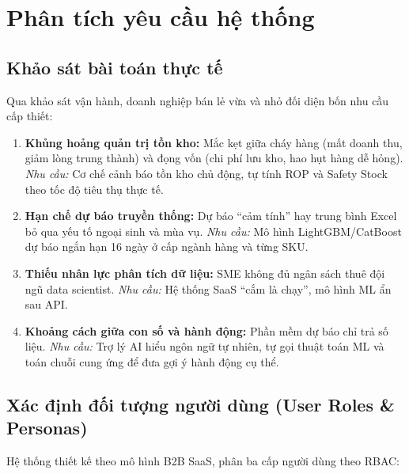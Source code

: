 \documentclass[12pt,a4paper]{report}
\begin{document}
\section{Phân tích yêu cầu hệ thống}

\subsection{Khảo sát bài toán thực tế}
Qua khảo sát vận hành, doanh nghiệp bán lẻ vừa và nhỏ đối diện bốn nhu cầu cấp thiết:

\begin{enumerate}
    \item \textbf{Khủng hoảng quản trị tồn kho:} Mắc kẹt giữa cháy hàng (mất doanh thu, giảm lòng trung thành) và đọng vốn (chi phí lưu kho, hao hụt hàng dễ hỏng). \textit{Nhu cầu:} Cơ chế cảnh báo tồn kho chủ động, tự tính ROP và Safety Stock theo tốc độ tiêu thụ thực tế.
    
    \item \textbf{Hạn chế dự báo truyền thống:} Dự báo ``cảm tính'' hay trung bình Excel bỏ qua yếu tố ngoại sinh và mùa vụ. \textit{Nhu cầu:} Mô hình LightGBM/CatBoost dự báo ngắn hạn 16 ngày ở cấp ngành hàng và từng SKU.
    
    \item \textbf{Thiếu nhân lực phân tích dữ liệu:} SME không đủ ngân sách thuê đội ngũ data scientist. \textit{Nhu cầu:} Hệ thống SaaS ``cắm là chạy'', mô hình ML ẩn sau API.
    
    \item \textbf{Khoảng cách giữa con số và hành động:} Phần mềm dự báo chỉ trả số liệu. \textit{Nhu cầu:} Trợ lý AI hiểu ngôn ngữ tự nhiên, tự gọi thuật toán ML và toán chuỗi cung ứng để đưa gợi ý hành động cụ thể.
\end{enumerate}

\subsection{Xác định đối tượng người dùng (User Roles \& Personas)}
Hệ thống thiết kế theo mô hình B2B SaaS, phân ba cấp người dùng theo RBAC:
\end{document}

